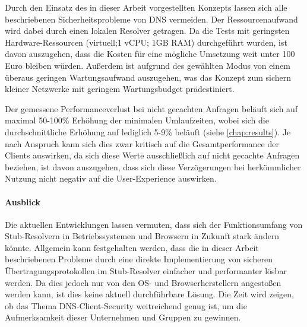 Durch den Einsatz des in dieser Arbeit vorgestellten Konzepts lassen sich alle beschriebenen Sicherheitsprobleme von DNS vermeiden. Der Ressourcenaufwand wird dabei durch einen lokalen Resolver getragen. Da die Tests mit geringsten Hardware-Ressourcen (virtuell;1 vCPU; 1GB RAM) durchgeführt wurden, ist davon auszugehen, dass die Kosten für eine mögliche Umsetzung weit unter 100 Euro bleiben würden. Außerdem ist aufgrund des gewählten Modus von einem überaus geringen Wartungsaufwand auszugehen, was das Konzept zum sichern kleiner Netzwerke mit geringem Wartungsbudget prädestiniert.

Der gemessene Performanceverlust bei nicht gecachten Anfragen beläuft sich auf maximal 50-100\% Erhöhung der minimalen Umlaufzeiten, wobei sich die durchschnittliche Erhöhung auf lediglich 5-9\% beläuft  (siehe \ref{chap:results}). Je nach Anspruch kann sich dies zwar kritisch auf die Gesamtperformance der Clients auswirken, da sich diese Werte ausschließlich auf nicht gecachte Anfragen beziehen, ist davon auszugehen, dass sich diese Verzögerungen bei herkömmlicher Nutzung nicht negativ auf die User-Experience auswirken.

\paragraph{Ausblick}
Die aktuellen Entwicklungen lassen vermuten, dass sich der Funktionsumfang von Stub-Resolvern in Betriebssystemen \cite{Wallen2018} und Browsern \cite{McManus2018a} in Zukunft stark ändern könnte. Allgemein kann festgehalten werden, dass die in dieser Arbeit beschriebenen Probleme durch eine direkte Implementierung von sicheren Übertragungsprotokollen im Stub-Resolver einfacher und performanter lösbar werden. Da dies jedoch nur von den \ac{OS}- und Browserherstellern angestoßen werden kann, ist dies keine aktuell durchführbare Lösung. Die Zeit wird zeigen, ob das Thema DNS-Client-Security weitreichend genug ist, um die Aufmerksamkeit dieser Unternehmen und Gruppen zu gewinnen.  

